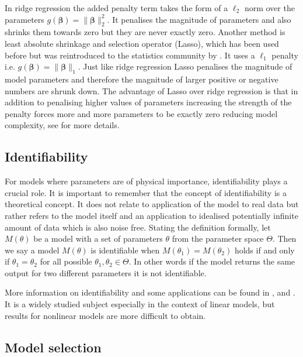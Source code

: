 In ridge regression the added penalty term takes the form of a $\ell_2$ norm over the parameters $g(\boldsymbol{\beta}) = \lVert \boldsymbol{\beta} \rVert_2^2$. It penalises the magnitude of parameters and also shrinks them towards zero but they are never exactly zero. Another method is least absolute shrinkage and selection operator (Lasso), which has been used before but was reintroduced to the statistics community by \cite{Tibshirani:1996wba}. It uses a $\ell_1$ penalty i.e. $g(\boldsymbol{\beta}) = \lVert \boldsymbol{\beta} \rVert_1$. Just like ridge regression Lasso penalises the magnitude of model parameters and therefore the magnitude of larger positive or negative numbers are shrunk down. The advantage of Lasso over ridge regression is that in addition to penalising higher values of parameters increasing the strength of the penalty forces more and more parameters to be exactly zero reducing model complexity, see \cite{hastie2001elements} for more details.

\subsection{Identifiability}
\label{sec:identifiability-back}

For models where parameters are of physical importance, identifiability plays a crucial role. It is important to remember that the concept of identifiability is a theoretical concept. It does not relate to application of the model to real data but rather refers to the model itself and an application to idealised potentially infinite amount of data which is also noise free. Stating the definition formally, let $M(\theta)$ be a model with a set of parameters $\theta$ from the parameter space $\Theta$. Then we say a model $M(\theta)$ is identifiable when $M(\theta_1) = M(\theta_2)$ holds if and only if $\theta_1 = \theta_2$ for all possible $\theta_1, \theta_2 \in \Theta$. In other words if the model returns the same output for two different parameters it is not identifiable.

More information on identifiability and some applications can be found in \cite{Saccomani:2003kx},  \cite{Saccomani:2010by} and \cite{Jacquez:1985fz}. It is a widely studied subject especially in the context of linear models, but results for nonlinear models are more difficult to obtain.

\subsection{Model selection}
\label{sec:model-selection-1}

